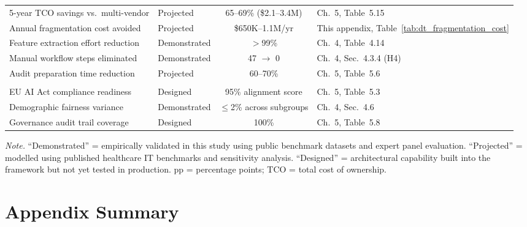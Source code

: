 {\begin{xltabular}{\textwidth}{@{} L L C L @{}}
5-year TCO savings vs.\ multi-vendor & Projected & 65--69\% (\$2.1--3.4M) & Ch.~5, Table~5.15 \\
Annual fragmentation cost avoided & Projected & \$650K--1.1M/yr & This appendix, Table~\ref{tab:dt_fragmentation_cost} \\
Feature extraction effort reduction & Demonstrated & $>$99\% & Ch.~4, Table~4.14 \\
Manual workflow steps eliminated & Demonstrated & 47 $\rightarrow$ 0 & Ch.~4, Sec.~4.3.4 (H4) \\
Audit preparation time reduction & Projected & 60--70\% & Ch.~5, Table~5.6 \\
\addlinespace
\midrule
{} \\
\addlinespace
EU AI Act compliance readiness & Designed & 95\% alignment score & Ch.~5, Table~5.3 \\
Demographic fairness variance & Demonstrated & $\leq$2\% across subgroups & Ch.~4, Sec.~4.6 \\
Governance audit trail coverage & Designed & 100\% & Ch.~5, Table~5.8 \\
\end{xltabular}}
\vspace{0.5em}\noindent\textit{Note.} ``Demonstrated'' = empirically validated in this study using public benchmark datasets and expert panel evaluation. ``Projected'' = modelled using published healthcare IT benchmarks and sensitivity analysis. ``Designed'' = architectural capability built into the framework but not yet tested in production. pp = percentage points; TCO = total cost of ownership.

\section{Appendix Summary}
\label{sec:dt_summary}

